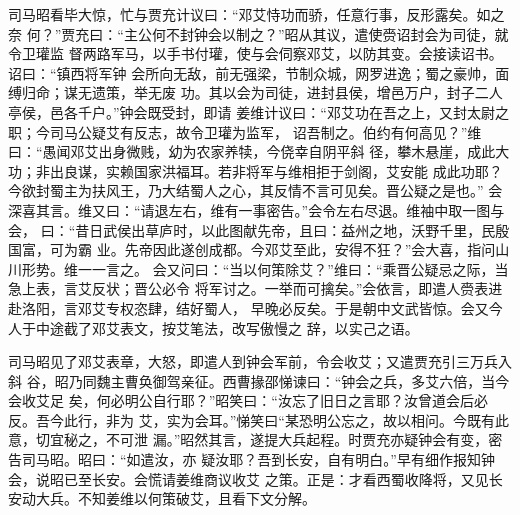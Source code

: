 司马昭看毕大惊，忙与贾充计议曰：“邓艾恃功而骄，任意行事，反形露矣。如之奈
何？”贾充曰：“主公何不封钟会以制之？”昭从其议，遣使赍诏封会为司徒，就令卫瓘监
督两路军马，以手书付瓘，使与会伺察邓艾，以防其变。会接读诏书。诏曰：“镇西将军钟
会所向无敌，前无强梁，节制众城，网罗进逸；蜀之豪帅，面缚归命；谋无遗策，举无废
功。其以会为司徒，进封县侯，增邑万户，封子二人亭侯，邑各千户。”钟会既受封，即请
姜维计议曰：“邓艾功在吾之上，又封太尉之职；今司马公疑艾有反志，故令卫瓘为监军，
诏吾制之。伯约有何高见？”维曰：“愚闻邓艾出身微贱，幼为农家养犊，今侥幸自阴平斜
径，攀木悬崖，成此大功；非出良谋，实赖国家洪福耳。若非将军与维相拒于剑阁，艾安能
成此功耶？今欲封蜀主为扶风王，乃大结蜀人之心，其反情不言可见矣。晋公疑之是也。”
会深喜其言。维又曰：“请退左右，维有一事密告。”会令左右尽退。维袖中取一图与会，
曰：“昔日武侯出草庐时，以此图献先帝，且曰：益州之地，沃野千里，民殷国富，可为霸
业。先帝因此遂创成都。今邓艾至此，安得不狂？”会大喜，指问山川形势。维一一言之。
会又问曰：“当以何策除艾？”维曰：“乘晋公疑忌之际，当急上表，言艾反状；晋公必令
将军讨之。一举而可擒矣。”会依言，即遣人赍表进赴洛阳，言邓艾专权恣肆，结好蜀人，
早晚必反矣。于是朝中文武皆惊。会又今人于中途截了邓艾表文，按艾笔法，改写傲慢之
辞，以实己之语。

司马昭见了邓艾表章，大怒，即遣人到钟会军前，令会收艾；又遣贾充引三万兵入斜
谷，昭乃同魏主曹奂御驾亲征。西曹掾邵悌谏曰：“钟会之兵，多艾六倍，当今会收艾足
矣，何必明公自行耶？”昭笑曰：“汝忘了旧日之言耶？汝曾道会后必反。吾今此行，非为
艾，实为会耳。”悌笑曰“某恐明公忘之，故以相问。今既有此意，切宜秘之，不可泄
漏。”昭然其言，遂提大兵起程。时贾充亦疑钟会有变，密告司马昭。昭曰：“如遣汝，亦
疑汝耶？吾到长安，自有明白。”早有细作报知钟会，说昭已至长安。会慌请姜维商议收艾
之策。正是：才看西蜀收降将，又见长安动大兵。不知姜维以何策破艾，且看下文分解。
